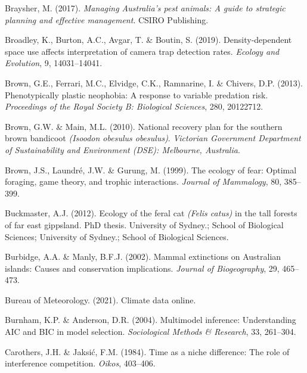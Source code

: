 \documentclass[11pt,a4paper,titlepage,twoside,openright]{style/unimelbthesis}
\begin{document}
\begin{mainmatter}
\leavevmode\hypertarget{ref-braysher2017managing}{}%
Braysher, M. (2017). \emph{Managing Australia's pest animals: A guide to strategic planning and effective management}. CSIRO Publishing.

\leavevmode\hypertarget{ref-broadley2019density}{}%
Broadley, K., Burton, A.C., Avgar, T. \& Boutin, S. (2019). Density-dependent space use affects interpretation of camera trap detection rates. \emph{Ecology and Evolution}, 9, 14031--14041.

\leavevmode\hypertarget{ref-brown2013phenotypically}{}%
Brown, G.E., Ferrari, M.C., Elvidge, C.K., Ramnarine, I. \& Chivers, D.P. (2013). Phenotypically plastic neophobia: A response to variable predation risk. \emph{Proceedings of the Royal Society B: Biological Sciences}, 280, 20122712.

\leavevmode\hypertarget{ref-brown2010national}{}%
Brown, G.W. \& Main, M.L. (2010). National recovery plan for the southern brown bandicoot \emph{(Isoodon obesulus obesulus)}. \emph{Victorian Government Department of Sustainability and Environment (DSE): Melbourne, Australia}.

\leavevmode\hypertarget{ref-brown1999ecology}{}%
Brown, J.S., Laundré, J.W. \& Gurung, M. (1999). The ecology of fear: Optimal foraging, game theory, and trophic interactions. \emph{Journal of Mammalogy}, 80, 385--399.

\leavevmode\hypertarget{ref-buckmaster2012ecology}{}%
Buckmaster, A.J. (2012). Ecology of the feral cat \emph{(Felis catus)} in the tall forests of far east gippsland. PhD thesis. University of Sydney.; School of Biological Sciences; University of Sydney.; School of Biological Sciences.

\leavevmode\hypertarget{ref-burbidge2002mammal}{}%
Burbidge, A.A. \& Manly, B.F.J. (2002). Mammal extinctions on Australian islands: Causes and conservation implications. \emph{Journal of Biogeography}, 29, 465--473.

\leavevmode\hypertarget{ref-BOM2021}{}%
Bureau of Meteorology. (2021). Climate data online.

\leavevmode\hypertarget{ref-burnham2004multimodel}{}%
Burnham, K.P. \& Anderson, D.R. (2004). Multimodel inference: Understanding AIC and BIC in model selection. \emph{Sociological Methods \& Research}, 33, 261--304.

\leavevmode\hypertarget{ref-carothers1984time}{}%
Carothers, J.H. \& Jaksić, F.M. (1984). Time as a niche difference: The role of interference competition. \emph{Oikos}, 403--406.


\end{mainmatter}
\end{document}
